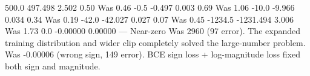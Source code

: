 {}\markdownRendererPipe{} 500.0 \markdownRendererPipe{} 497.498 \markdownRendererPipe{} 2.502 \markdownRendererPipe{} 0.50\markdownRendererPercentSign{} \markdownRendererPipe{} Was 0.46\markdownRendererPercentSign{} \markdownRendererPipe{}\markdownRendererSoftLineBreak
{}\markdownRendererPipe{}  \markdownRendererPipe{}  \markdownRendererPipe{}  \markdownRendererPipe{} \markdownRendererStrongEmphasis{0.60\markdownRendererPercentSign{}} \markdownRendererPipe{}  \markdownRendererPipe{}\markdownRendererSoftLineBreak
{}\markdownRendererPipe{} -0.5 \markdownRendererPipe{} -0.497 \markdownRendererPipe{} 0.003 \markdownRendererPipe{} 0.69\markdownRendererPercentSign{} \markdownRendererPipe{} Was 1.06\markdownRendererPercentSign{} \markdownRendererPipe{}\markdownRendererSoftLineBreak
{}\markdownRendererPipe{} -10.0 \markdownRendererPipe{} -9.966 \markdownRendererPipe{} 0.034 \markdownRendererPipe{} 0.34\markdownRendererPercentSign{} \markdownRendererPipe{} Was 0.19\markdownRendererPercentSign{} \markdownRendererPipe{}\markdownRendererSoftLineBreak
{}\markdownRendererPipe{} -42.0 \markdownRendererPipe{} -42.027 \markdownRendererPipe{} 0.027 \markdownRendererPipe{} 0.07\markdownRendererPercentSign{} \markdownRendererPipe{} Was 0.45\markdownRendererPercentSign{} \markdownRendererPipe{}\markdownRendererSoftLineBreak
{}\markdownRendererPipe{} -1234.5 \markdownRendererPipe{} -1231.494 \markdownRendererPipe{} 3.006 \markdownRendererPipe{} \markdownRendererStrongEmphasis{0.24\markdownRendererPercentSign{}} \markdownRendererPipe{} Was 1.73\markdownRendererPercentSign{} \markdownRendererPipe{}\markdownRendererSoftLineBreak
{}\markdownRendererPipe{} 0.0 \markdownRendererPipe{} -0.00000 \markdownRendererPipe{} 0.00000 \markdownRendererPipe{} — \markdownRendererPipe{} Near-zero \markdownRendererPipe{}\markdownRendererInterblockSeparator
{}
\markdownRendererSectionEnd \markdownRendererSectionBegin
{}\markdownRendererInterblockSeparator
{}\markdownRendererOlBeginTight
{} Was 2960 (97\markdownRendererPercentSign{} error). The expanded training distribution and wider clip completely solved the large-number problem.\markdownRendererOlItemEnd 
{} Was -0.00006 (wrong sign, 149\markdownRendererPercentSign{} error). BCE sign loss + log-magnitude loss fixed both sign and magnitude.\markdownRendererOlItemEnd 
